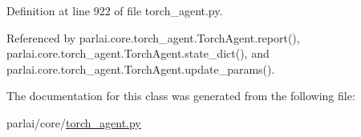 Definition at line 922 of file torch\+\_\+agent.\+py.



Referenced by parlai.\+core.\+torch\+\_\+agent.\+Torch\+Agent.\+report(), parlai.\+core.\+torch\+\_\+agent.\+Torch\+Agent.\+state\+\_\+dict(), and parlai.\+core.\+torch\+\_\+agent.\+Torch\+Agent.\+update\+\_\+params().



The documentation for this class was generated from the following file\+:\begin{DoxyCompactItemize}
\item 
parlai/core/\hyperlink{torch__agent_8py}{torch\+\_\+agent.\+py}\end{DoxyCompactItemize}
